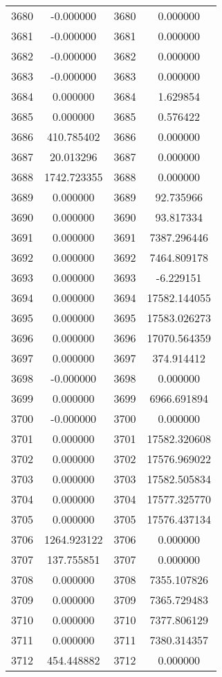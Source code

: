 \documentclass[12pt]{article}
\begin{document}
\begin{longtable}{@{}cccc@{}}
3680 & -0.000000 & 3680 & 0.000000 \\
3681 & -0.000000 & 3681 & 0.000000 \\
3682 & -0.000000 & 3682 & 0.000000 \\
3683 & -0.000000 & 3683 & 0.000000 \\
3684 & 0.000000 & 3684 & 1.629854 \\
3685 & 0.000000 & 3685 & 0.576422 \\
3686 & 410.785402 & 3686 & 0.000000 \\
3687 & 20.013296 & 3687 & 0.000000 \\
3688 & 1742.723355 & 3688 & 0.000000 \\
3689 & 0.000000 & 3689 & 92.735966 \\
3690 & 0.000000 & 3690 & 93.817334 \\
3691 & 0.000000 & 3691 & 7387.296446 \\
3692 & 0.000000 & 3692 & 7464.809178 \\
3693 & 0.000000 & 3693 & -6.229151 \\
3694 & 0.000000 & 3694 & 17582.144055 \\
3695 & 0.000000 & 3695 & 17583.026273 \\
3696 & 0.000000 & 3696 & 17070.564359 \\
3697 & 0.000000 & 3697 & 374.914412 \\
3698 & -0.000000 & 3698 & 0.000000 \\
3699 & 0.000000 & 3699 & 6966.691894 \\
3700 & -0.000000 & 3700 & 0.000000 \\
3701 & 0.000000 & 3701 & 17582.320608 \\
3702 & 0.000000 & 3702 & 17576.969022 \\
3703 & 0.000000 & 3703 & 17582.505834 \\
3704 & 0.000000 & 3704 & 17577.325770 \\
3705 & 0.000000 & 3705 & 17576.437134 \\
3706 & 1264.923122 & 3706 & 0.000000 \\
3707 & 137.755851 & 3707 & 0.000000 \\
3708 & 0.000000 & 3708 & 7355.107826 \\
3709 & 0.000000 & 3709 & 7365.729483 \\
3710 & 0.000000 & 3710 & 7377.806129 \\
3711 & 0.000000 & 3711 & 7380.314357 \\
3712 & 454.448882 & 3712 & 0.000000 \\

\end{longtable}
\end{document}
